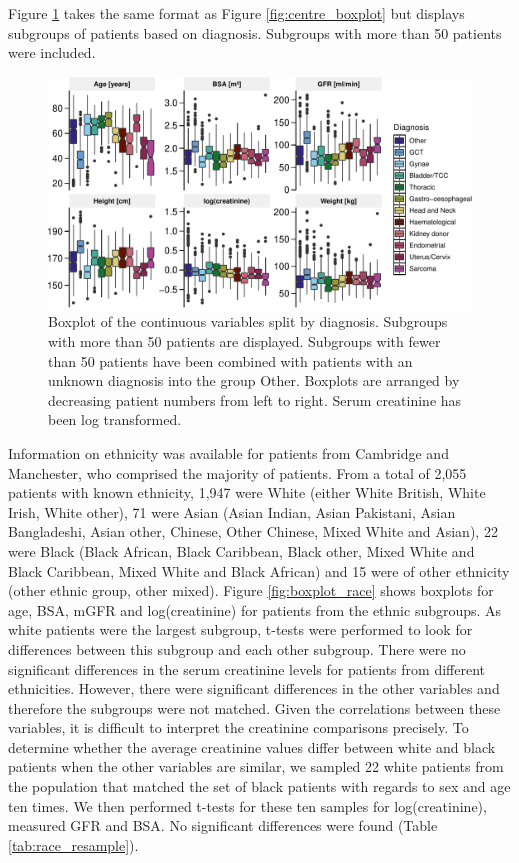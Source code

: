 \documentclass[11pt,]{article}
\begin{document}
Figure \ref{fig:boxplot_diagnosis} takes the same format as Figure
\ref{fig:centre_boxplot} but displays subgroups of patients based on
diagnosis. Subgroups with more than 50 patients were included.

\begin{figure}
\centering
\includegraphics{1_Validation_nonIDMS_files/figure-latex/data_characteristics_plots_2-1.pdf}
\caption{\label{fig:boxplot_diagnosis}Boxplot of the continuous
variables split by diagnosis. Subgroups with more than 50 patients are
displayed. Subgroups with fewer than 50 patients have been combined with
patients with an unknown diagnosis into the group Other. Boxplots are
arranged by decreasing patient numbers from left to right. Serum
creatinine has been log transformed.}
\end{figure}

Information on ethnicity was available for patients from Cambridge and
Manchester, who comprised the majority of patients. From a total of
2,055 patients with known ethnicity, 1,947 were White (either White
British, White Irish, White other), 71 were Asian (Asian Indian, Asian
Pakistani, Asian Bangladeshi, Asian other, Chinese, Other Chinese, Mixed
White and Asian), 22 were Black (Black African, Black Caribbean, Black
other, Mixed White and Black Caribbean, Mixed White and Black African)
and 15 were of other ethnicity (other ethnic group, other mixed). Figure
\ref{fig:boxplot_race} shows boxplots for age, BSA, mGFR and
log(creatinine) for patients from the ethnic subgroups. As white
patients were the largest subgroup, t-tests were performed to look for
differences between this subgroup and each other subgroup. There were no
significant differences in the serum creatinine levels for patients from
different ethnicities. However, there were significant differences in
the other variables and therefore the subgroups were not matched. Given
the correlations between these variables, it is difficult to interpret
the creatinine comparisons precisely. To determine whether the average
creatinine values differ between white and black patients when the other
variables are similar, we sampled 22 white patients from the population
that matched the set of black patients with regards to sex and age ten
times. We then performed t-tests for these ten samples for
log(creatinine), measured GFR and BSA. No significant differences were
found (Table \ref{tab:race_resample}).
\end{document}

